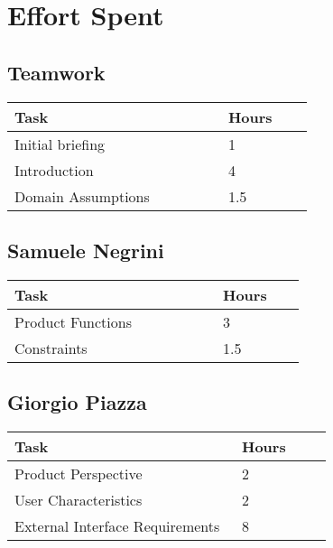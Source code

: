 \chapter{Effort Spent}

\section{Teamwork}
\vspace{2mm}
\begin{center}
    \begin{tabular}{@{}p{0.5\linewidth} p{0.2\linewidth}@{}}
        \hline
        \textbf{Task} & \textbf{Hours} \\ \hline
        Initial briefing & 1 \\ \hline
        Introduction & 4 \\ \hline
        Domain Assumptions & 1.5 \\ \hline
    \end{tabular}
\end{center}

\section{Samuele Negrini}
\vspace{2mm}
\begin{center}
	\begin{tabular}{@{}p{0.5\linewidth} p{0.2\linewidth}@{}}
		\hline
		\textbf{Task} & \textbf{Hours} \\ \hline
		Product Functions & 3 \\ \hline
		Constraints & 1.5 \\ \hline
	\end{tabular}
\end{center}

\section{Giorgio Piazza}
\vspace{2mm}
\begin{center}
	\begin{tabular}{@{}p{0.5\linewidth} p{0.2\linewidth}@{}}
		\hline
		\textbf{Task} & \textbf{Hours} \\ \hline
		Product Perspective & 2 \\ \hline
		User Characteristics & 2 \\ \hline
		External Interface Requirements & 8 \\ \hline
	\end{tabular}
\end{center}